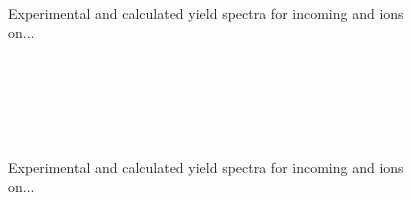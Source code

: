 \begin{refsection}
\begin{figure}[!t]
    \centering
    \begin{subfigure}[t]{0.49\textwidth}
        \centering
        
    \end{subfigure}%
    ~ 
    \begin{subfigure}[t]{0.49\textwidth}
        \centering
        
    \end{subfigure}
    \begin{subfigure}[t]{0.49\textwidth}
        \centering
        
    \end{subfigure}%
    ~ 
    \begin{subfigure}[t]{0.49\textwidth}
        \centering
        
    \end{subfigure}
    \begin{subfigure}[t]{0.49\textwidth}
        \centering
        
    \end{subfigure}%
    ~ 
    \begin{subfigure}[t]{0.49\textwidth}
        \centering
        
    \end{subfigure}
    \caption{\label{quotas:fig-metals_results1} Experimental and calculated yield spectra for incoming  and  ions on...}
\end{figure}

\begin{figure}[!t]
    \centering
    \begin{subfigure}[t]{0.49\textwidth}
        \centering
        
    \end{subfigure}%
    ~ 
    \begin{subfigure}[t]{0.49\textwidth}
        \centering
        
    \end{subfigure}
    \begin{subfigure}[t]{0.49\textwidth}
        \centering
        
    \end{subfigure}%
    ~ 
    \begin{subfigure}[t]{0.49\textwidth}
        \centering
        
    \end{subfigure}
    \begin{subfigure}[t]{0.49\textwidth}
        \centering
        
    \end{subfigure}%
    ~ 
    \begin{subfigure}[t]{0.49\textwidth}
        \centering
        
    \end{subfigure}
    \caption{\label{quotas:fig-metals_results2} Experimental and calculated yield spectra for incoming  and  ions on...}
\end{figure}



\end{refsection}
